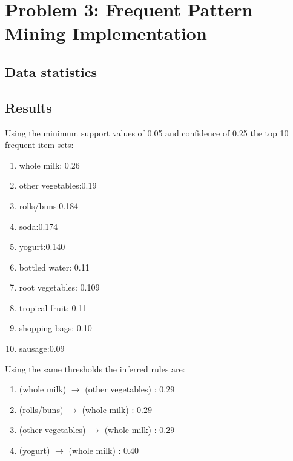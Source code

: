 \documentclass[11pt]{article}
\begin{document}
\section{Problem 3: Frequent Pattern Mining Implementation}
\subsection{Data statistics}
\begin{table}[]
    \centering
    \caption{Grocery dataset statistics}
    \label{tab:stats}
\end{table}
\subsection{Results }
Using the minimum support values of 0.05 and confidence of 0.25 the top 10 frequent item sets:
\begin{enumerate}
    \item whole milk: 0.26
    \item other vegetables:0.19
    \item rolls/buns:0.184
    \item soda:0.174
    \item yogurt:0.140
    \item bottled water: 0.11
    \item root vegetables: 0.109
    \item tropical fruit: 0.11
    \item shopping bags: 0.10
    \item sausage:0.09
\end{enumerate}
Using the same thresholds the inferred rules are:
\begin{enumerate}
    \item (whole milk) $\rightarrow$ (other vegetables) : $0.29$
    \item (rolls/buns) $\rightarrow$ (whole milk) : $0.29$
    \item (other vegetables) $\rightarrow$ (whole milk) : $0.29$
    \item (yogurt) $\rightarrow$ (whole milk) : $0.40$
\end{enumerate}
\end{document}
